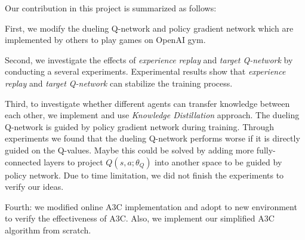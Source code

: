 
Our contribution in this project is summarized as follows:

First, we modify the dueling Q-network and policy gradient network which are implemented by others to play games on OpenAI gym.

Second, we investigate the effects of \textit{experience replay} and \textit{target Q-network} by conducting a several experiments. Experimental results show that \textit{experience replay} and \textit{target Q-network} can stabilize the training process.

Third, to investigate whether different agents can transfer knowledge between each other, we implement and use \textit{Knowledge Distillation } approach. The dueling Q-network is guided by policy gradient network during training. Through experiments we found that the dueling Q-network performs worse if it is directly guided on the Q-values. 
%
Maybe this could be solved by adding more fully-connected layers to project $Q(s,a;\theta_{Q})$ into another space to be guided by policy network.
%
Due to time limitation, we did not finish the experiments to verify our ideas.

Fourth: we modified online A3C implementation and adopt to new environment to verify the effectiveness
of A3C. Also, we implement our simplified A3C algorithm from scratch.
